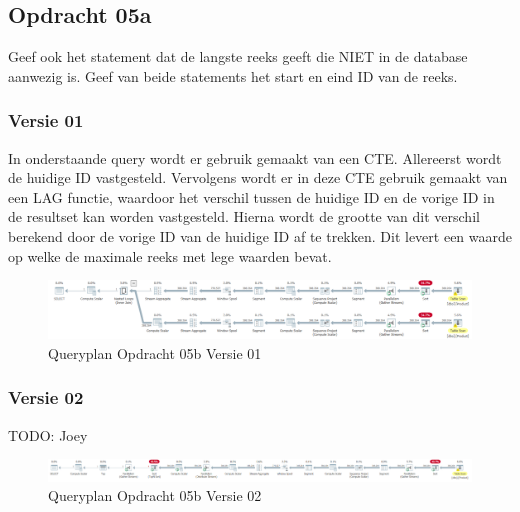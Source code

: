 \subsection{Opdracht 05a}
Geef ook het statement dat de langste reeks geeft die NIET in de database aanwezig is. Geef van beide statements het start en eind ID van de reeks.

\subsubsection{Versie 01}
In onderstaande query wordt er gebruik gemaakt van een CTE. Allereerst wordt de huidige ID vastgesteld. Vervolgens wordt er in deze
CTE gebruik gemaakt van een LAG functie, waardoor het verschil tussen de huidige ID en de vorige ID in de resultset kan worden vastgesteld.
Hierna wordt de grootte van dit verschil berekend door de vorige ID van de huidige ID af te trekken. Dit levert een waarde op welke
de maximale reeks met lege waarden bevat.

\begin{figure}[H]
    \centering
    \includegraphics[width=1\textwidth]{image/marc/opdracht-05b.PNG}
    \caption{Queryplan Opdracht 05b Versie 01}
\end{figure}

\subsubsection{Versie 02}
TODO: Joey

\begin{figure}[H]
    \centering
    \includegraphics[width=1\textwidth]{image/joey/opdracht-05b.PNG}
    \caption{Queryplan Opdracht 05b Versie 02}
\end{figure}

